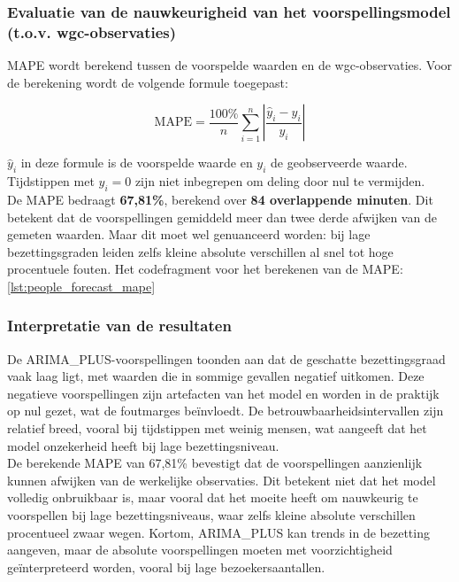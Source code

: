 \subsubsection{Evaluatie van de nauwkeurigheid van het voorspellingsmodel (t.o.v. \gls{wgc}-observaties)}
MAPE wordt berekend tussen de voorspelde waarden en de \gls{wgc}-observaties. Voor de berekening wordt de volgende formule toegepast: 

\[
\mathrm{MAPE} = \frac{100\%}{n} \sum_{i=1}^n \left| \frac{\hat{y}_i - y_i}{y_i} \right|
\]

$\hat{y}_i$ in deze formule is de voorspelde waarde en $y_i$ de geobserveerde waarde. Tijdstippen met $y_i = 0$ zijn niet inbegrepen om deling door nul te vermijden. \\

De MAPE bedraagt \textbf{67,81\%}, berekend over \textbf{84 overlappende minuten}. Dit betekent dat de voorspellingen gemiddeld meer dan twee derde afwijken van de gemeten waarden. Maar dit moet wel genuanceerd worden: bij lage bezettingsgraden leiden zelfs kleine absolute verschillen al snel tot hoge procentuele fouten. Het codefragment voor het berekenen van de MAPE: \ref{lst:people_forecast_mape} 





\subsubsection{Interpretatie van de resultaten} 
De ARIMA\_PLUS-voorspellingen toonden aan dat de geschatte bezettingsgraad vaak laag ligt, met waarden die in sommige gevallen negatief uitkomen. Deze negatieve voorspellingen zijn artefacten van het model en worden in de praktijk op nul gezet, wat de foutmarges beïnvloedt. De betrouwbaarheidsintervallen zijn relatief breed, vooral bij tijdstippen met weinig mensen, wat aangeeft dat het model onzekerheid heeft bij lage bezettingsniveau. \\

De berekende MAPE van 67,81\% bevestigt dat de voorspellingen aanzienlijk kunnen afwijken van de werkelijke observaties. Dit betekent niet dat het model volledig onbruikbaar is, maar vooral dat het moeite heeft om nauwkeurig te voorspellen bij lage bezettingsniveaus, waar zelfs kleine absolute verschillen procentueel zwaar wegen. Kortom, ARIMA\_PLUS kan trends in de bezetting aangeven, maar de absolute voorspellingen moeten met voorzichtigheid geïnterpreteerd worden, vooral bij lage bezoekersaantallen.


